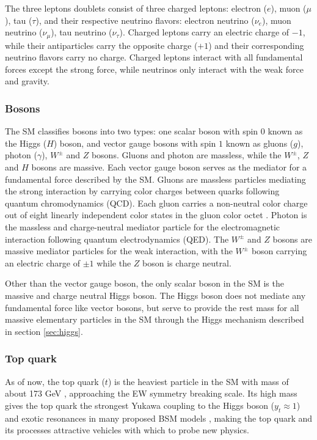 \documentclass[../thesis.tex]{subfiles}
\begin{document}
The three leptons doublets consist of three charged leptons: electron ($e$), muon ($\mu$), tau ($\tau$), and their respective neutrino flavors: electron neutrino ($\nu_e$), muon neutrino ($\nu_\mu$), tau neutrino ($\nu_\tau$). Charged leptons carry an electric charge of $-1$, while their antiparticles carry the opposite charge ($+1$) and their corresponding neutrino flavors carry no charge. Charged leptons interact with all fundamental forces except the strong force, while neutrinos only interact with the weak force and gravity.

\subsubsection*{Bosons}
The \acs{SM} classifies bosons into two types: one scalar boson with spin $0$ known as the Higgs ($H$) boson, and vector gauge bosons with spin $1$ known as gluons ($g$), photon ($\gamma$), $W^\pm$ and $Z$ bosons. Gluons and photon are massless, while the $W^\pm$, $Z$ and $H$ bosons are massive. Each vector gauge boson serves as the mediator for a fundamental force described by the \acs{SM}. Gluons are massless particles mediating the strong interaction by carrying color charges between quarks following quantum chromodynamics (\acs{QCD}). Each gluon carries a non-neutral color charge out of eight linearly independent color states in the gluon color octet \citep{theory:gellmann}. Photon is the massless and charge-neutral mediator particle for the electromagnetic interaction following quantum electrodynamics (\acs{QED}). The $W^\pm$ and $Z$ bosons are massive mediator particles for the weak interaction, with the $W^\pm$ boson carrying an electric charge of $\pm 1$ while the $Z$ boson is charge neutral.

Other than the vector gauge boson, the only scalar boson in the \acs{SM} is the massive and charge neutral Higgs boson. The Higgs boson does not mediate any fundamental force like vector bosons, but serve to provide the rest mass for all massive elementary particles in the SM through the Higgs mechanism described in section \ref{sec:higgs}.

\subsubsection*{Top quark}
\label{sec:top}

As of now, the top quark ($t$) is the heaviest particle in the \acs{SM} with mass of about 173 GeV \citep{PDG}, approaching the \acs{EW} symmetry breaking scale. Its high mass gives the top quark the strongest Yukawa coupling to the Higgs boson ($y_t \approx 1$) \citep{theory:top_coupling} and exotic resonances in many proposed \acs{BSM} models \citep{theory:top_exotics,theory:top_exotics2,theory:top_exotics3,theory:top_exotics4}, making the top quark and its processes attractive vehicles with which to probe new physics.
\end{document}

